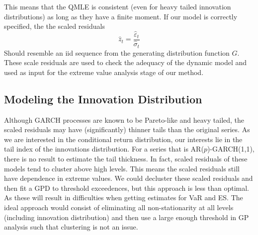 \documentclass{article}
\theoremstyle{definition}
\theoremstyle{definition}
\begin{document}
This means that the QMLE is consistent (even for heavy tailed innovation distributions) as long as they have a finite moment. If our model is correctly specified, the the scaled residuals
\[\hat{z}_t=\frac{\hat\varepsilon_t}{\hat\sigma_t}\]
Should resemble an iid sequence from the generating distribution function $G$. These scale residuals are used to check the adequacy of the dynamic model and used as input for the extreme value analysis stage of our method. 
\subsection{Modeling the Innovation Distribution}
Although GARCH processes are known to be Pareto-like and heavy tailed, the scaled residuals may have (significantly) thinner tails than the original series. As we are interested in the conditional return distribution, our interests lie in the tail index of the innovations distribution. For a series that is AR($p$)-GARCH(1,1), there is no result to estimate the tail thickness. In fact, scaled residuals of these models tend to cluster above high levels. This means the scaled residuals still have dependence in extreme values. We could decluster these scaled residuals and then fit a GPD to threshold exceedences, but this approach is less than optimal. As these will result in difficulties when getting estimates for VaR and ES. The ideal approach would consist of eliminating all non-stationarity at all levels (including innovation distribution) and then use a large enough threshold in GP analysis such that clustering is not an issue. 
\end{document}
